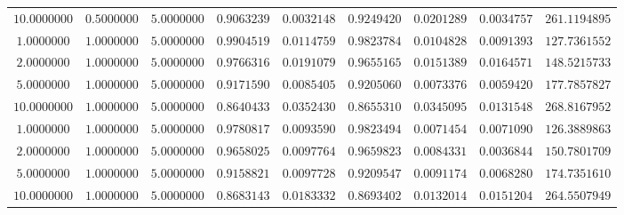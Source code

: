 \begin{tabular}{ccccccccc}
$10.0000000$ & $0.5000000$ & $5.0000000$ & $0.9063239$ & $0.0032148$ & $0.9249420$ & $0.0201289$ & $0.0034757$ & $261.1194895$\\
$1.0000000$ & $1.0000000$ & $5.0000000$ & $0.9904519$ & $0.0114759$ & $0.9823784$ & $0.0104828$ & $0.0091393$ & $127.7361552$\\
$2.0000000$ & $1.0000000$ & $5.0000000$ & $0.9766316$ & $0.0191079$ & $0.9655165$ & $0.0151389$ & $0.0164571$ & $148.5215733$\\
$5.0000000$ & $1.0000000$ & $5.0000000$ & $0.9171590$ & $0.0085405$ & $0.9205060$ & $0.0073376$ & $0.0059420$ & $177.7857827$\\
$10.0000000$ & $1.0000000$ & $5.0000000$ & $0.8640433$ & $0.0352430$ & $0.8655310$ & $0.0345095$ & $0.0131548$ & $268.8167952$\\
$1.0000000$ & $1.0000000$ & $5.0000000$ & $0.9780817$ & $0.0093590$ & $0.9823494$ & $0.0071454$ & $0.0071090$ & $126.3889863$\\
$2.0000000$ & $1.0000000$ & $5.0000000$ & $0.9658025$ & $0.0097764$ & $0.9659823$ & $0.0084331$ & $0.0036844$ & $150.7801709$\\
$5.0000000$ & $1.0000000$ & $5.0000000$ & $0.9158821$ & $0.0097728$ & $0.9209547$ & $0.0091174$ & $0.0068280$ & $174.7351610$\\
$10.0000000$ & $1.0000000$ & $5.0000000$ & $0.8683143$ & $0.0183332$ & $0.8693402$ & $0.0132014$ & $0.0151204$ & $264.5507949$\\
\end{tabular}
